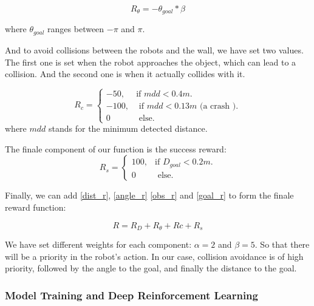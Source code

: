 \documentclass[12pt]{extarticle}
\begin{document}
     \begin{equation} \label{angle_r}
     R_{\theta}=-\theta_{goal}*\beta
   \end{equation}
 
 where $\theta_{goal}$  ranges  between $-\pi$  and $\pi$.
 
And to avoid collisions between the robots and the wall, we have set two values. The first one is set when the robot approaches the object, which can lead to a collision. And the second one is when it actually collides with it.


\begin{equation}  \label{obs_r}
  R_{c}=\begin{cases}
    -50, & \text{if $mdd< 0.4m$}.\\
    -100 , & \text{ if $mdd <0.13m$ (a crash )}.\\
    0 & \text{ else}.
  \end{cases}
\end{equation}
where $mdd$ stands for the minimum detected distance.\linebreak

The finale component of our  function is the success reward:
\begin{equation}  \label{goal_r}
  R_{s}=\begin{cases}
    100, & \text{if $D_{goal}< 0.2m$}.\\
    
    0 & \text{ else}.
  \end{cases}
\end{equation}

Finally, we can add \ref{dist_r}, \ref{angle_r}  \ref{obs_r} and \ref{goal_r} to form the finale reward function: 

 
    \begin{equation} \label{final_r}
     R=R_{D}+R_{\theta}+R{c}+R_{s}
   \end{equation}

We have set different weights for each component: $\alpha = 2$ and $\beta = 5$. So that there will be a priority in the robot's action. In our case, collision avoidance is of high priority, followed by the angle to the goal, and finally the distance to the goal.




\subsubsection{Model Training and Deep Reinforcement Learning}
\end{document}
